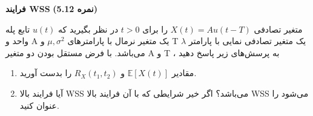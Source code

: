 \Large \textbf{فرایند WSS}
\large \textbf{(5.12 نمره)}

\normalsize \vspace{0.5cm}

متغیر تصادفی
$X\left( t \right) = Au\left( {t - T} \right)$
را برای
$t > 0$
در نظر بگیرید که
$u\left( t \right)$
تابع پله واحد و A یک متغیر نرمال با پارامترهای
$\mu ,{\sigma ^2}$
و T یک متغیر تصادفی نمایی با پارامتر
$\lambda$
می‌باشد. با فرض مستقل بودن دو متغیر A و T ، به پرسش‌های زیر پاسخ دهید

\begin{enumerate}[label=(\alph*)]
	\item
	مقادیر
	$\mathbb{E}\left[ {X\left( t \right)} \right]$
	و
	${R_X}\left( {{t_1},{t_2}} \right)$
	را بدست آورید.
	\item
	آیا فرایند بالا WSS می‌باشد؟ اگر خیر شرایطی که با آن فرایند بالا WSS می‌شود را عنوان کنید.

\end{enumerate}